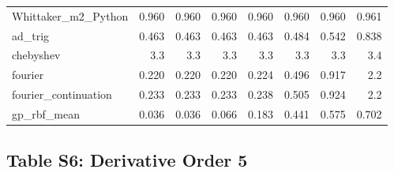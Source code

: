 \documentclass[10pt]{article}
\begin{document}
\begin{longtable}{lrrrrrrr}
Whittaker\_m2\_Python & 0.960 & 0.960 & 0.960 & 0.960 & 0.960 & 0.960 & 0.961 \\
ad\_trig & 0.463 & 0.463 & 0.463 & 0.463 & 0.484 & 0.542 & 0.838 \\
chebyshev & 3.3 & 3.3 & 3.3 & 3.3 & 3.3 & 3.3 & 3.4 \\
fourier & 0.220 & 0.220 & 0.220 & 0.224 & 0.496 & 0.917 & 2.2 \\
fourier\_continuation & 0.233 & 0.233 & 0.233 & 0.238 & 0.505 & 0.924 & 2.2 \\
gp\_rbf\_mean & 0.036 & 0.036 & 0.066 & 0.183 & 0.441 & 0.575 & 0.702 \\
\bottomrule
\end{longtable}

\clearpage

\subsection*{Table S6: Derivative Order 5}
\end{document}
